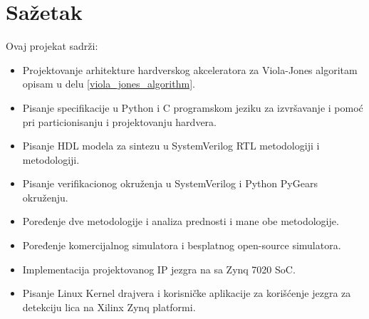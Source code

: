 \section{Sažetak}

Ovaj projekat sadrži:
\begin{itemize}
  \item Projektovanje arhitekture hardverskog akceleratora za Viola-Jones algoritam opisam u delu \ref{viola_jones_algorithm}.
  \item Pisanje specifikacije u Python i C programskom jeziku za izvršavanje i
    pomoć pri particionisanju i projektovanju hardvera.
  \item Pisanje HDL modela za sintezu u SystemVerilog RTL metodologiji i
    \PyGears{} metodologiji.
  \item Pisanje verifikacionog okruženja u SystemVerilog \UVM{} i Python PyGears
    okruženju.
  \item Poređenje dve metodologije i analiza prednosti i mane obe metodologije.
  \item Poređenje komercijalnog \QuestaSim{} simulatora i besplatnog open-source
    \Verilator{} simulatora.
  \item Implementacija projektovanog IP jezgra na \ZTurn{} sa Zynq
    7020 SoC.
  \item Pisanje Linux Kernel drajvera i korisničke aplikacije za korišćenje
    jezgra za detekciju lica na Xilinx Zynq platformi.

\end{itemize}
